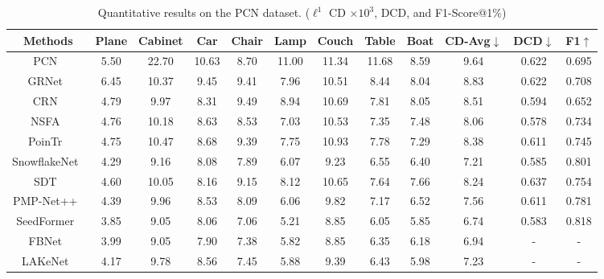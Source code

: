 \begin{table*}[t]
    \tiny
    \renewcommand\arraystretch{1.2}
    \centering
    \caption{Quantitative results on the PCN dataset. ({$\displaystyle \ell ^{1}$} CD $\times 10^3$, DCD, and F1-Score@1\%)}
    \label{tab:pcnl1}
    \small
    \begin{tabular}{|c|cccccccc|ccc|}
    \hline
    Methods & Plane & Cabinet & Car & Chair & Lamp & Couch & Table & Boat & CD-Avg$\downarrow$  & DCD$\downarrow$  &F1$\uparrow$  \\
    \hline
              PCN~\citep{yuan2018pcn} & 5.50 & 22.70 & 10.63 & 8.70 & 11.00 & 11.34 & 11.68 & 8.59 & 9.64& 0.622 &0.695\\
              GRNet~\citep{xie2020grnet}  & 6.45 & 10.37 & 9.45 & 9.41 & 7.96 & 10.51 & 8.44 & 8.04& 8.83& 0.622 &0.708\\
              CRN~\citep{wang2020cascaded}    & 4.79 & 9.97 & 8.31 & 9.49 & 8.94 & 10.69 & 7.81 & 8.05& 8.51& 0.594 & 0.652 \\
              NSFA~\citep{zhang2020detail}    & 4.76 & 10.18 & 8.63 & 8.53 & 7.03 & 10.53 & 7.35 & 7.48 & 8.06 & 0.578 & 0.734 \\
              PoinTr~\citep{yu2021pointr}  & 4.75 & 10.47 & 8.68 & 9.39 & 7.75 & 10.93 & 7.78 & 7.29 & 8.38 & 0.611 & 0.745 \\
              SnowflakeNet~\citep{9928787} & 4.29 & 9.16 & 8.08 & 7.89 & 6.07 & 9.23 & 6.55 & 6.40& 7.21& 0.585 & 0.801 \\
              SDT~\citep{zhang2022point} & 4.60 & 10.05 & 8.16 & 9.15 & 8.12 & 10.65 & 7.64 & 7.66 & 8.24 & 0.637 &0.754 \\
              PMP-Net++~\citep{wen2022pmp} & 4.39 & 9.96 & 8.53 & 8.09 & 6.06 & 9.82 & 7.17 & 6.52& 7.56 & 0.611 & 0.781\\
              SeedFormer~\citep{zhou2022seedformer}  & 3.85 & 9.05 & 8.06 & 7.06 & 5.21 & 8.85 & 6.05 & 5.85 & 6.74 & 0.583 & 0.818 \\
              FBNet~\citep{yan2022fbnet}  & 3.99 & 9.05 & 7.90 & 7.38 & 5.82 & 8.85 & 6.35 & 6.18& 6.94& - & -\\
              LAKeNet~\citep{tang2022lake}  & 4.17 & 9.78 & 8.56 & 7.45 & 5.88 & 9.39 & 6.43 & 5.98 & 7.23 & - & -\\
    

\end{tabular}
\end{table*}
